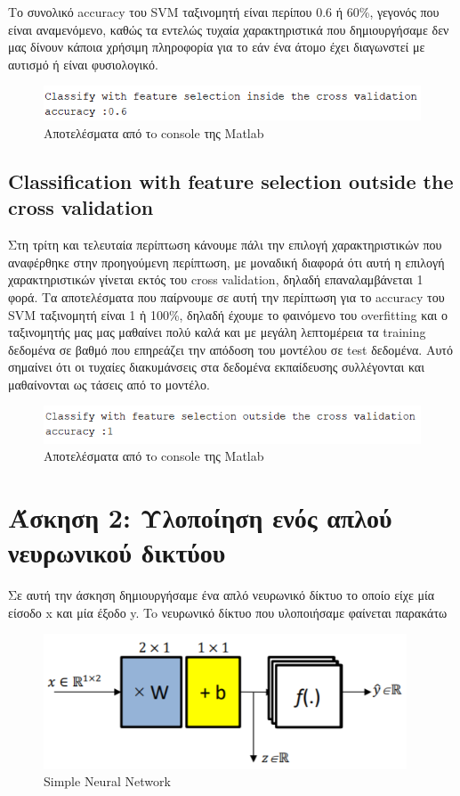 \documentclass{article}
\begin{document}
	\noindent
	Tο συνολικό accuracy του SVM ταξινομητή είναι περίπου 0.6 ή 60\%, γεγονός που είναι αναμενόμενο, καθώς τα εντελώς τυχαία χαρακτηριστικά που δημιουργήσαμε δεν μας δίνουν κάποια χρήσιμη πληροφορία για το εάν ένα άτομο έχει διαγωνστεί με αυτισμό ή είναι φυσιολογικό.
	\begin{figure}[h!]
		\centering
		\includegraphics[width=0.7\linewidth]{../exercise3_1/images/classify_with_feature_selection_inside_cross_validation.png}
		\caption{Αποτελέσματα από τo console της Matlab}
	\end{figure}
\subsection*{Classification with feature selection outside the cross validation}
	Στη τρίτη και τελευταία περίπτωση κάνουμε πάλι την επιλογή χαρακτηριστικών που αναφέρθηκε στην προηγούμενη περίπτωση, με μοναδική διαφορά ότι αυτή η επιλογή χαρακτηριστικών γίνεται εκτός του cross validation, δηλαδή επαναλαμβάνεται 1 φορά. Τα αποτελέσματα που παίρνουμε σε αυτή την περίπτωση για το accuracy του SVM ταξινομητή είναι 1 ἠ 100\%, δηλαδή έχουμε το φαινόμενο του overfitting και ο ταξινομητής μας μας μαθαίνει πολύ καλά και με μεγάλη λεπτομέρεια τα training δεδομένα σε βαθμό που επηρεάζει την απόδοση του μοντέλου σε test δεδομένα. Αυτό σημαίνει ότι οι τυχαίες διακυμάνσεις στα δεδομένα εκπαίδευσης συλλέγονται και μαθαίνονται ως τάσεις από το μοντέλο.
	
	\begin{figure}[h!]
		\centering
		\includegraphics[width=0.7\linewidth]{../exercise3_1/images/classify_with_feature_selection_outside_cross_validation.png}
		\caption{Αποτελέσματα από τo console της Matlab}
	\end{figure}
\section*{Άσκηση 2: Υλοποίηση ενός απλού νευρωνικού δικτύου}
	Σε αυτή την άσκηση δημιουργήσαμε ένα απλό νευρωνικό δίκτυο το οποίο είχε μία είσοδο x και μία έξοδο y. To νευρωνικό δίκτυο που υλοποιήσαμε φαίνεται παρακάτω 
	
	\begin{figure}[h!]
		\centering
		\includegraphics[height=4cm,width=0.5\linewidth]{../exercise3_2/python/images/simple_neural_network.png}
		\caption{Simple Neural Network}
	\end{figure}
\end{document}
